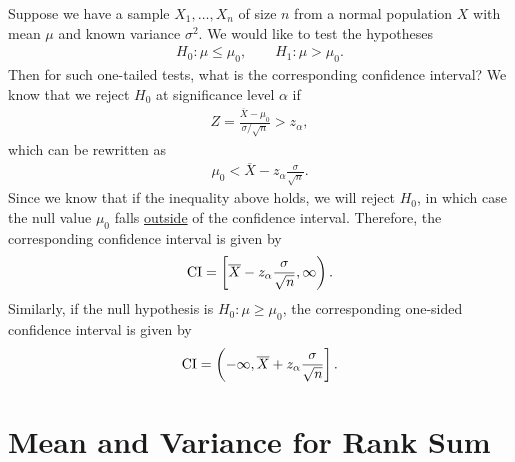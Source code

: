 Suppose we have a sample $X_1, \ldots, X_n$ of size $n$ from a normal population $X$ with mean $\mu$ and known variance $\sigma^2$. We would like to test the hypotheses
\begin{align*}
H_0: \mu \leq \mu_0, \qquad H_1: \mu > \mu_0.
\end{align*}
Then for such one-tailed tests, what is the corresponding confidence interval? We know that we reject $H_0$ at significance level $\alpha$ if 
\begin{align*}
Z = \frac{\overline{X} - \mu_0}{\sigma/\sqrt{n}} > z_{\alpha},
\end{align*}
which can be rewritten as
\begin{align*}
\mu_0 < \overline{X} - z_{\alpha}\frac{\sigma}{\sqrt{n}}.
\end{align*}
Since we know that if the inequality above holds, we will reject $H_0$, in which case the null value $\mu_0$ falls \underline{outside} of the confidence interval. Therefore, the corresponding confidence interval is given by
\begin{align*}
\mathrm{CI} = \left[\overline{X} - z_{\alpha}\frac{\sigma}{\sqrt{n}}, \infty \right).
\end{align*}
Similarly, if the null hypothesis is $H_0: \mu\geq \mu_0$, the corresponding one-sided confidence interval is given by
\begin{align*}
\mathrm{CI} = \left(-\infty, \overline{X} + z_{\alpha}\frac{\sigma}{\sqrt{n}} \right].
\end{align*}


\section*{Mean and Variance for Rank Sum}

